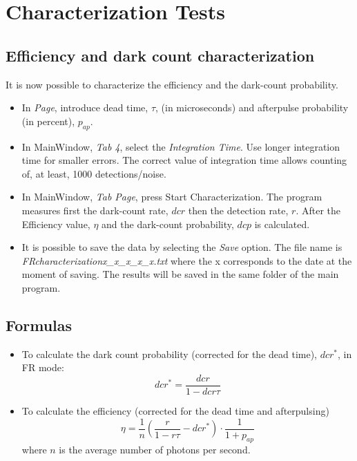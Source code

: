 \documentclass{article}
\begin{document}
 
\section{Characterization Tests}

\subsection{Efficiency and dark count characterization}


It is now possible to characterize the efficiency and the dark-count probability.

\begin{itemize}
\item
In \emph{Page}, introduce dead time, $\tau$, (in microseconds) and afterpulse probability (in percent), $p_{ap}$.
\item
In MainWindow, \emph{Tab 4}, select the \emph{Integration Time}. Use longer integration time for smaller errors. The correct value of integration time allows counting of, at least, 1000 detections/noise. 
\item In MainWindow, \emph{Tab Page}, press Start Characterization. The program measures first the dark-count rate, $dcr$ then the detection rate, $r$. After the Efficiency value, $\eta$ and the dark-count probability, $dcp$ is calculated.
\item
It is possible to save the data by selecting the \emph{Save} option. The file name is \emph{FRcharacterizationx\_x\_x\_x\_x.txt} where the x corresponds to the date at the moment of saving. The results will be saved in the same folder of the main program.
\end{itemize}
\subsection*{Formulas}
\begin{itemize}
\item To calculate the dark count probability (corrected for the dead time), $dcr^*$, in FR mode:
\begin{equation}
dcr^*=\frac{dcr}{1-dcr\tau}
\end{equation}
\item To calculate the efficiency (corrected for the dead time and afterpulsing)
\begin{equation}
\eta=\frac{1}{n}\left(\frac{r}{1-r\tau}-dcr^*\right)\cdot\frac{1}{1+p_{ap}}
\end{equation}
where $n$ is the average number of photons per second.


\end{itemize}
\end{document}
